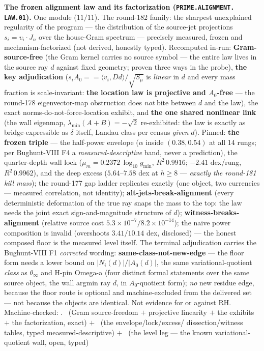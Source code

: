 \par\smallskip\noindent\textbf{The frozen alignment law and its
factorization (\texttt{PRIME.\allowbreak ALIGNMENT.\allowbreak
LAW.01}).}
One module ($11/11$).  The round-182 family: the sharpest
unexplained regularity of the program --- the distribution of the
source-jet projections $s_i = v_i \cdot J_n$ over the house-Gram
spectrum --- precisely measured, frozen and mechanism-factorized
(not derived, honestly typed).  Recomputed in-run:
\textbf{Gram-source-free} (the Gram kernel carries no source
symbol --- the entire law lives in the source ray $d$ against
fixed geometry; proven three ways in the probe), \textbf{the key
adjudication} ($s_i A_0 == \langle v_i, D d\rangle/\sqrt{S_\mu}$
is \emph{linear} in $d$ and every mass fraction is
scale-invariant: \textbf{the location law is projective and
$A_0$-free} --- the round-178 eigenvector-map obstruction does
\emph{not} bite between $d$ and the law), the exact
norms-do-not-force-location exhibit, and \textbf{the one shared
nonlinear link} (the wall eigenmap, $\lambda_{\min}(A+B) =
-\sqrt{2}$ re-exhibited: the law is exactly as bridge-expressible
as $\delta$ itself, Landau class per census \emph{given} $d$).
Pinned: \textbf{the frozen triple} --- the half-power envelope
($\alpha$ inside $(0.38, 0.54)$ at all 14 rungs; per Bughunt-VIII
F4 a \emph{measured-descriptive} band, never a prediction), the
quarter-depth wall lock ($\mu_m = 0.2372\,\log_{10} g_{\min}$,
$R^2\,0.9916$; $-2.41$ dex/rung, $R^2\,0.9962$), and the deep
excess ($5.64$--$7.58$ dex at $h \ge 8$ --- \emph{exactly the
round-181 kill mass}); the round-177 gap ladder replicates exactly
(one object, two currencies --- measured correlation, not
identity); \textbf{alt-jets-break-alignment} (every deterministic
deformation of the true ray snaps the mass to the top: the law
needs the joint exact sign-and-magnitude structure of $d$);
\textbf{witness-breaks-alignment} (relative source cost
$5.3\times10^{-7}/8.2\times10^{-14}$); the naive power composition
is invalid (overshoots $3.41/10.14$ dex, disclosed) --- the honest
composed floor is the measured level itself.  The terminal
adjudication carries the Bughunt-VIII F1 \emph{corrected} wording:
\textbf{same-class-not-new-edge} --- the floor form needs a lower
bound on $|N_i(d)|/|A_0(d)|$, the same variational-quotient
\emph{class} as $\theta_\infty$ and H-pin Omega-a (four distinct
formal statements over the same source object, the wall argmin ray
$d$, in $A_0$-quotient form); \emph{no} new residue edge, because
the floor route is optional and machine-excluded from the
delivered set --- not because the objects are identical.  Not
evidence for or against RH.
Machine-checked: .
\mE\ (Gram source-freedom $+$ projective linearity $+$ the exhibits
$+$ the factorization, exact) $+$ \mC\ (the envelope/lock/excess/
dissection/witness tables, typed measured-descriptive) $+$ \mO\
(the level leg --- the known variational-quotient wall, open,
typed)
\par\smallskip


